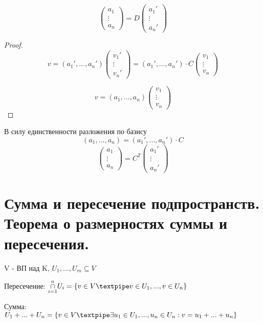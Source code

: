 \documentclass[12pt, fleqn]{article}
\begin{document}
			\begin{theorem} 
					\[\begin{pmatrix}
						a_1\\
						\vdots\\
						a_n
					\end{pmatrix} = D
				   \begin{pmatrix}
				   		a_1'\\
						\vdots\\
						a_n'
				   \end{pmatrix}\]
			\end{theorem}
			\begin{proof}
				\[v = (a_1', ..., a_n') \begin{pmatrix}
					v_1'\\
					\vdots\\
					v_n'
				\end{pmatrix} =
				(a_1', ..., a_n') \cdot C \begin{pmatrix}
					v_1 \\
					\vdots\\
					v_n
				\end{pmatrix} \]

				\[v = (a_1, ..., a_n) \begin{pmatrix}
					v_1\\
					\vdots\\
					v_n
				\end{pmatrix} \]
			\end{proof}
			В силу единственности разложения по базису
			\[(a_1, ..., a_n) = (a_1', ..., a_n') \cdot C  \]
			\[\begin{pmatrix}
				a_1\\
				\vdots\\
				a_n
			\end{pmatrix} = C^T
			\begin{pmatrix}
				a_1'\\
				\vdots\\
				a_n'
			\end{pmatrix}\]


\section{Сумма и пересечение подпространств. Теорема о размерностях суммы и пересечения.}
  \begin{definition}
    V - ВП над K, \qq $U_1,...,U_m \subseteq V$

    Пересечение: $\underset{i=1}{\overset{n}{\cap}} U_i = \{ v \in V \textpipe v \in U_1,...,v \in U_n\}$

    Сумма: $U_1+...+U_n=\{v \in V \textpipe \exists u_1 \in U_1,...,u_n \in U_n: v=u_1+... + u_n \}$
  \end{definition}
\end{document}
